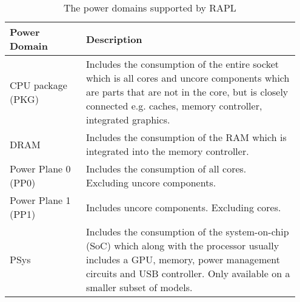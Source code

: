 \begin{table}[ht]
    \begin{tabular}{| p{0.25\linewidth} | p{0.7\linewidth}|}
    \hline
    \textbf{Power Domain}  & \textbf{Description}                            \\ \hline
    CPU package (PKG)        & Includes the consumption of the entire socket which is all cores and uncore components which are parts that are not in the core, but is closely connected e.g. caches, memory controller, integrated graphics.       \\ \hline
    DRAM                & Includes the consumption of the RAM which is integrated into the memory controller.                       \\ \hline
    Power Plane 0 (PP0)                 & Includes the consumption of all cores. Excluding uncore components.               \\ \hline
    Power Plane 1 (PP1)      & Includes uncore components. Excluding cores.           \\ \hline
    PSys & Includes the consumption of the system-on-chip (SoC) which along with the processor usually includes a GPU, memory, power management circuits and USB controller. Only available on a smaller subset of models.       \\ \hline
    \end{tabular}
    \caption{The power domains supported by RAPL}
    \label{tab:RAPL_Domain}
    \end{table}